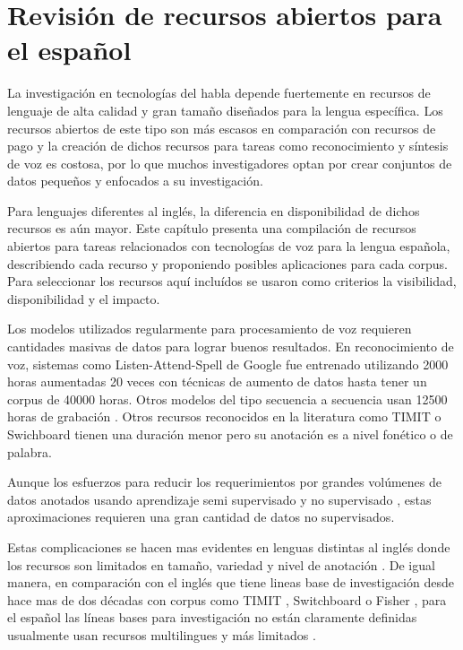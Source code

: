 

\chapter{Revisión de recursos abiertos para el español}

La investigación en tecnologías del habla depende fuertemente en recursos de lenguaje de alta calidad y gran tamaño diseñados para la lengua específica. Los recursos abiertos de este tipo son más escasos en comparación con recursos de pago y la creación de dichos recursos para tareas como reconocimiento y síntesis de voz es costosa, por lo que muchos investigadores optan por crear conjuntos de datos pequeños y enfocados a su investigación.

Para lenguajes diferentes al inglés, la diferencia en disponibilidad de dichos recursos es aún mayor. Este capítulo presenta una compilación de recursos abiertos para tareas relacionados con tecnologías de voz para la lengua española, describiendo cada recurso y proponiendo posibles aplicaciones para cada corpus. Para seleccionar los recursos aquí incluídos se usaron como criterios la visibilidad, disponibilidad y el impacto.


Los modelos utilizados regularmente para procesamiento de voz requieren cantidades masivas de datos para lograr buenos resultados. En reconocimiento de voz, sistemas como Listen-Attend-Spell de Google \cite{Chan2016} fue entrenado utilizando 2000 horas aumentadas 20 veces con técnicas de aumento de datos hasta tener un corpus de 40000 horas. Otros modelos del tipo secuencia a secuencia usan 12500 horas de grabación \cite{Chiu2018}. Otros recursos reconocidos en la literatura como  TIMIT \cite{TIMIT} o Swichboard \cite{Switchboard} tienen una duración menor pero su anotación es a nivel fonético o de palabra.

Aunque los esfuerzos para reducir los requerimientos por grandes volúmenes de datos anotados usando aprendizaje semi supervisado \cite{AmazonSemiSupervised} y no supervisado \cite{ZeroResources}, estas aproximaciones requieren una gran cantidad de datos no supervisados.

Estas complicaciones se hacen mas evidentes en lenguas distintas al inglés donde los recursos son limitados en tamaño, variedad y nivel de anotación \cite{HernndezMena2017}. De igual manera, en comparación con el inglés que  tiene lineas base de investigación desde hace mas de dos décadas con corpus como TIMIT \cite{TIMIT}, Switchboard \cite{Switchboard} o Fisher \cite{Fisher}, para el español las líneas bases para investigación no están claramente definidas usualmente usan recursos multilingues y más limitados \cite{euronews_multilingual,librilight}.

